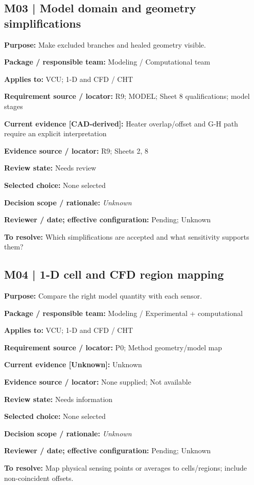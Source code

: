 \documentclass[11pt]{article}
\begin{document}
\begin{minipage}{\textwidth}\small\setlength{\parskip}{2pt}
\subsection*{M03 | Model domain and geometry simplifications}
\textbf{Purpose:} Make excluded branches and healed geometry visible.\par
\textbf{Package / responsible team:} Modeling / Computational team\par
\textbf{Applies to:} VCU; 1-D and CFD / CHT\par
\textbf{Requirement source / locator:} R9; MODEL; Sheet 8 qualifications; model stages\par
\textbf{Current evidence [CAD-derived]:} Heater overlap/offset and G-H path require an explicit interpretation\par
\textbf{Evidence source / locator:} R9; Sheets 2, 8\par
\textbf{Review state:} Needs review\par
\textbf{Selected choice:} None selected\par
\textbf{Decision scope / rationale:} \textit{Unknown}\par
\textbf{Reviewer / date; effective configuration:} Pending; Unknown\par
\textbf{To resolve:} Which simplifications are accepted and what sensitivity supports them?\par
\end{minipage}\par\vspace{5pt}
\begin{minipage}{\textwidth}\small\setlength{\parskip}{2pt}
\subsection*{M04 | 1-D cell and CFD region mapping}
\textbf{Purpose:} Compare the right model quantity with each sensor.\par
\textbf{Package / responsible team:} Modeling / Experimental + computational\par
\textbf{Applies to:} VCU; 1-D and CFD / CHT\par
\textbf{Requirement source / locator:} P0; Method geometry/model map\par
\textbf{Current evidence [Unknown]:} Unknown\par
\textbf{Evidence source / locator:} None supplied; Not available\par
\textbf{Review state:} Needs information\par
\textbf{Selected choice:} None selected\par
\textbf{Decision scope / rationale:} \textit{Unknown}\par
\textbf{Reviewer / date; effective configuration:} Pending; Unknown\par
\textbf{To resolve:} Map physical sensing points or averages to cells/regions; include non-coincident offsets.\par
\end{minipage}\par\vspace{5pt}
\end{document}
